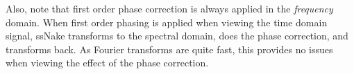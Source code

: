\documentclass[11pt,a4paper]{article}
\begin{document}
Also, note that first order phase correction is always applied in the \textit{frequency} domain. When first order phasing is applied when viewing the time domain signal, ssNake transforms to the spectral domain, does the phase correction, and transforms back. As Fourier transforms are quite fast, this provides no issues when viewing the effect of the phase correction.


\end{document}
